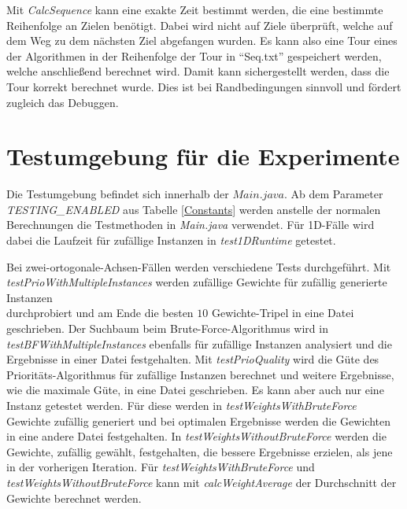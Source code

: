 \documentclass[german,version-2019-11]{uzl-thesis}
\begin{document}
Mit \emph{CalcSequence} kann eine exakte Zeit bestimmt werden, die eine bestimmte Reihenfolge an Zielen benötigt. Dabei wird nicht auf Ziele überprüft, welche auf dem Weg zu dem nächsten Ziel abgefangen wurden. Es kann also eine Tour eines der Algorithmen in der Reihenfolge der Tour in ``Seq.txt'' gespeichert werden, welche anschließend berechnet wird. Damit kann sichergestellt werden, dass die Tour korrekt berechnet wurde. Dies ist bei Randbedingungen sinnvoll und fördert zugleich das Debuggen. 

\section{Testumgebung für die Experimente}

Die Testumgebung befindet sich innerhalb der $Main.java$. Ab dem Parameter \\\emph{TESTING\_ENABLED} aus Tabelle \ref{Constants} werden anstelle der normalen Berechnungen die Testmethoden in \emph{Main.java} verwendet. Für 1D-Fälle wird dabei die Laufzeit für zufällige Instanzen in \emph{test1DRuntime} getestet. 

Bei zwei-ortogonale-Achsen-Fällen werden verschiedene Tests durchgeführt. Mit \emph{testPrioWithMultipleInstances} werden zufällige Gewichte für zufällig generierte Instanzen\\ durchprobiert und am Ende die besten $10$ Gewichte-Tripel in eine Datei geschrieben. Der Suchbaum beim Brute-Force-Algorithmus wird in \emph{testBFWithMultipleInstances} ebenfalls für zufällige Instanzen analysiert und die Ergebnisse in einer Datei festgehalten. Mit \emph{testPrioQuality} wird die Güte des Prioritäts-Algorithmus für zufällige Instanzen berechnet und weitere Ergebnisse, wie die maximale Güte, in eine Datei geschrieben. Es kann aber auch nur eine Instanz getestet werden. Für diese werden in \emph{testWeightsWithBruteForce} Gewichte zufällig generiert und bei optimalen Ergebnisse werden die Gewichten in eine andere Datei festgehalten. In \emph{testWeightsWithoutBruteForce} werden die Gewichte, zufällig gewählt, festgehalten, die bessere Ergebnisse erzielen, als jene in der vorherigen Iteration. Für \emph{testWeightsWithBruteForce} und \emph{testWeightsWithoutBruteForce} kann mit \emph{calcWeightAverage} der Durchschnitt der Gewichte berechnet werden.
\end{document}
